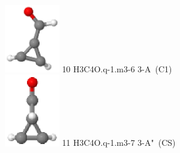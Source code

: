 \documentclass[10pt]{article}
\begin{document}
\begin{tabular}
\includegraphics[width=2.40000000000000000000cm]{H3C4O.q-1.m3-6.eps} \tiny{10 \hspace{1.20000000000000000000cm} H3C4O.q-1.m3-6 \hspace{5pt} 3-A~(C1)} 
\\\hline
\includegraphics[width=2.40000000000000000000cm]{H3C4O.q-1.m3-7.eps} \tiny{11 \hspace{1.20000000000000000000cm} H3C4O.q-1.m3-7 \hspace{5pt} 3-A"~(CS)} 
\\
\end{tabular}
\end{document}
